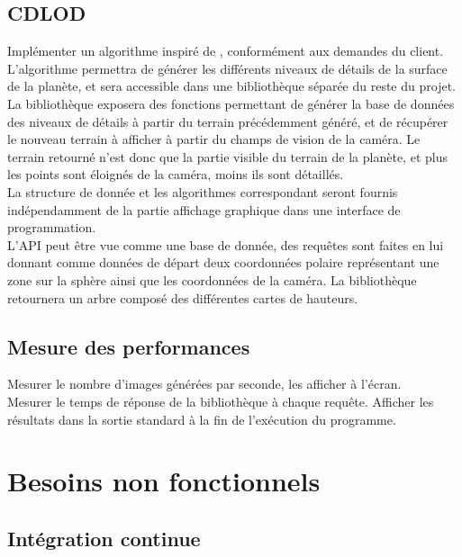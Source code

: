 \documentclass[12pt]{report}
\begin{document}
\subsection{CDLOD}

Implémenter un algorithme inspiré de \cite{CDLOD}, conformément aux demandes du client.
L'algorithme permettra de générer les différents niveaux de détails de
la surface de la planète, et sera accessible dans une bibliothèque
séparée du reste du projet.\\
La bibliothèque exposera des fonctions permettant de générer la base de
données des niveaux de détails à partir du terrain précédemment généré,
et de récupérer le nouveau terrain à afficher à partir du champs de
vision de la caméra. Le terrain retourné n'est donc que la partie
visible du terrain de la planète, et plus les points sont éloignés de la
caméra, moins ils sont détaillés.\\
La structure de donnée et les algorithmes correspondant seront fournis indépendamment de la partie affichage graphique dans une interface de programmation.\\
L'API peut être vue comme une base de donnée, des requêtes sont faites en lui donnant comme données de départ deux coordonnées polaire représentant une zone sur la sphère ainsi que les coordonnées de la caméra.
La bibliothèque retournera un arbre composé des différentes cartes de hauteurs.

\subsection{Mesure des performances}

Mesurer le nombre d'images générées par seconde, les afficher à l'écran.\\
Mesurer le temps de réponse de la bibliothèque à chaque requête. Afficher les résultats dans la sortie standard à la fin de l'exécution
du programme.\\


\section{Besoins non fonctionnels}

\subsection{Intégration continue}
\end{document}
